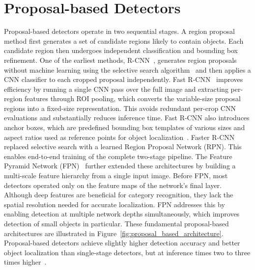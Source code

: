 \documentclass[12pt,oneside,bibtotoc,liststotoc]{scrbook}
\begin{document}
\vspace{-2em}
\section{Proposal-based Detectors}
\vspace{-0.5em}

Proposal-based detectors operate in two sequential stages.
A region proposal method first generates a set of candidate regions likely to contain objects.
Each candidate region then undergoes independent classification and bounding box refinement.
One of the earliest methods, R-CNN~\cite{girshick2014RCNN}, generates region proposals without machine learning using the
selective search algorithm~\cite{uijlings2013selectiveSearch} and then applies a CNN classifier to each cropped proposal independently.
Fast R-CNN~\cite{girshick2015fastRCNN} improves efficiency by running a single CNN pass over the full image and
extracting per-region features through ROI pooling, which converts the variable-size proposal regions into a fixed-size representation.
This avoids redundant per-crop CNN evaluations and substantially reduces inference time.
Fast R-CNN also introduces anchor boxes, which are predefined bounding box templates of various sizes and aspect ratios
used as reference points for object localization~\cite{girshick2015fastRCNN}.
Faster R-CNN~\cite{ren2016fasterRCNN} replaced selective search with a learned Region Proposal Network (RPN).
This enables end-to-end training of the complete two-stage pipeline.
The Feature Pyramid Network (FPN)~\cite{lin2017featurePyramidNetworks} further extended these architectures by building
a multi-scale feature hierarchy from a single input image.
Before FPN, most detectors operated only on the feature maps of the network's final layer.
Although deep features are beneficial for category recognition, they lack the spatial resolution needed for accurate localization.
FPN addresses this by enabling detection at multiple network depths simultaneously, which improves detection of small objects in particular.
These fundamental proposal-based architectures are illustrated in Figure~\ref{fig:proposal_based_architecture}.
Proposal-based detectors achieve slightly higher detection accuracy and better object localization than single-stage detectors,
but at inference times two to three times higher~\cite{carranza2020performanceSingleTwoStageDetectors, zou2023objectDetectionSurvey, advzemovic2025deepLearningMultiObjectTrackingSurvey, li2024developmentObjectDetectionSurvey}.
\end{document}
